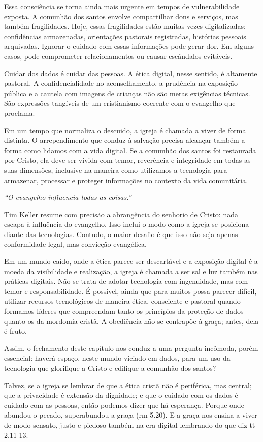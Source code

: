 Essa consciência se torna ainda mais urgente em tempos de vulnerabilidade exposta. A comunhão dos santos envolve compartilhar dons e serviços, mas também fragilidades. Hoje, essas fragilidades estão muitas vezes digitalizadas: confidências armazenadas, orientações pastorais registradas, histórias pessoais arquivadas. Ignorar o cuidado com essas informações pode gerar dor. Em alguns casos, pode comprometer relacionamentos ou causar escândalos evitáveis.

Cuidar dos dados é cuidar das pessoas. A ética digital, nesse sentido, é altamente pastoral. A confidencialidade no aconselhamento, a prudência na exposição pública e a cautela com imagens de crianças não são meras exigências técnicas. São expressões tangíveis de um cristianismo coerente com o evangelho que proclama.

Em um tempo que normaliza o descuido, a igreja é chamada a viver de forma distinta. O arrependimento que conduz à salvação precisa alcançar também a forma como lidamos com a vida digital. Se a comunhão dos santos foi restaurada por Cristo, ela deve ser vivida com temor, reverência e integridade em todas as suas dimensões, inclusive na maneira como utilizamos a tecnologia para armazenar, processar e proteger informações no contexto da vida comunitária.

\textit{``O evangelho influencia todas as coisas.''} \cite[p.~56]{keller2014}

Tim Keller resume com precisão a abrangência do senhorio de Cristo: nada escapa à influência do evangelho. Isso inclui o modo como a igreja se posiciona diante das tecnologias. Contudo, o maior desafio é que isso não seja apenas conformidade legal, mas convicção evangélica.

Em um mundo caído, onde a ética parece ser descartável e a exposição digital é a moeda da visibilidade e realização, a igreja é chamada a ser sal e luz também nas práticas digitais. Não se trata de adotar tecnologia com ingenuidade, mas com temor e responsabilidade. É possível, ainda que para muitos possa parecer difícil, utilizar recursos tecnológicos de maneira ética, consciente e pastoral quando formamos líderes que compreendam tanto os princípios da proteção de dados quanto os da mordomia cristã. A obediência não se contrapõe à graça; antes, dela é fruto.

Assim, o fechamento deste capítulo nos conduz a uma pergunta incômoda, porém essencial: haverá espaço, neste mundo viciado em dados, para um uso da tecnologia que glorifique a Cristo e edifique a comunhão dos santos?

Talvez, se a igreja se lembrar de que a ética cristã não é periférica, mas central; que a privacidade é extensão da dignidade; e que o cuidado com os dados é cuidado com as pessoas,  então podemos dizer que há esperança. Porque onde abundou o pecado, superabundou a graça (\gls{rm} 5.20). E a graça nos ensina a viver de modo sensato, justo e piedoso também na era digital lembrando do que diz \gls{tt} 2.11-13.